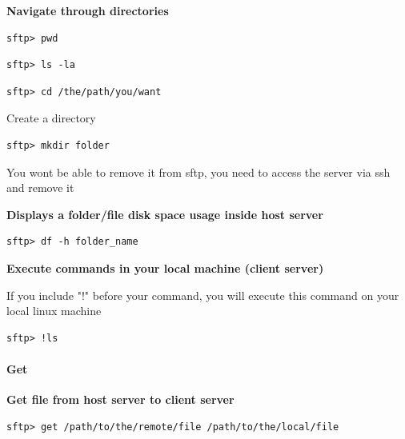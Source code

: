\documentclass{article}
\newenvironment{blocktemplateI}[1]{%
    \tcolorbox[beamer,%
    noparskip,breakable,
    colframe=Violet,%
    colbacklower=Black,%
    title=#1]}%
    {\endtcolorbox}
\newenvironment{codetemplate}[1][]{%
  \mybasecolorbox[#1]
  \itshape
}{%
  \endmybasecolorbox
}
\begin{document}
\textbf{Navigate through directories}
\begin{codetemplate}{}
\begin{verbatim}
sftp> pwd
\end{verbatim}
\end{codetemplate}

\begin{codetemplate}{}
\begin{verbatim}
sftp> ls -la
\end{verbatim}
\end{codetemplate}

\begin{codetemplate}{}
\begin{verbatim}
sftp> cd /the/path/you/want
\end{verbatim}
\end{codetemplate}

Create a directory
\begin{codetemplate}{}
\begin{verbatim}
sftp> mkdir folder
\end{verbatim}
\end{codetemplate}

\begin{blocktemplateI}{NOTE}
You wont be able to remove it from sftp, you need to access the server via ssh and remove it
\end{blocktemplateI}

\textbf{Displays a folder/file disk space usage inside host server}
\begin{codetemplate}{}
\begin{verbatim}
sftp> df -h folder_name
\end{verbatim}
\end{codetemplate}

\textbf{Execute commands in your local machine (client server)}

If you include "!" before your command, you will execute this command on your local linux machine
\begin{codetemplate}{}
\begin{verbatim}
sftp> !ls
\end{verbatim}
\end{codetemplate}

\paragraph{Get}

\textbf{Get file from host server to client server}
\begin{codetemplate}{}
\begin{verbatim}
sftp> get /path/to/the/remote/file /path/to/the/local/file
\end{verbatim}
\end{codetemplate}
\end{document}
